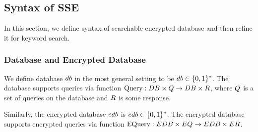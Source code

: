 \subsection{Syntax of SSE}
In this section, we define syntax of searchable encrypted database and then refine it for keyword search.


\subsubsection{Database and Encrypted Database}
We define database $db$ in the most general setting to be $db \in \{0,1\}^{*}$. The database supports queries via function $\text{Query}: DB \times Q \rightarrow DB \times R$, where $Q$ is a set of queries on the database and $R$ is some response. 

Similarly, the encrypted database $edb$ is  $edb \in \{0,1\}^{*}$. The encrypted database supports encrypted queries via function $\text{EQuery}: EDB \times EQ \rightarrow EDB \times ER$.


